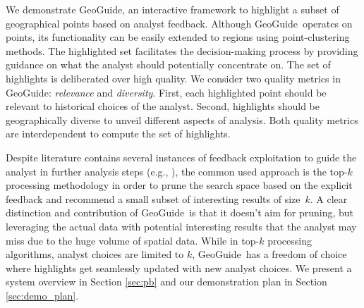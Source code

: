 \documentclass{vldb}
\newtheorem{example}{Example}
\newcommand{\framework}{{\sc GeoGuide}}
\begin{document}
\vspace{5pt}
 We demonstrate \framework, an interactive framework to highlight a subset of geographical points based on analyst feedback. Although \framework\ operates on points, its functionality can be easily extended to regions using point-clustering methods. The highlighted set facilitates the decision-making process by providing guidance on what the analyst should potentially concentrate on. The set of highlights is deliberated over high quality. We consider two quality metrics in \framework: {\em relevance} and {\em diversity}. First, each highlighted point should be relevant to historical choices of the analyst. Second, highlights should be geographically diverse to unveil different aspects of analysis. Both quality metrics are interdependent to compute the set of highlights.

Despite literature contains several instances of feedback exploitation to guide the analyst in further analysis steps (e.g., \cite{boley2013one}), the common used approach is the top-$k$ processing methodology in order to prune the search space based on the explicit feedback and recommend a small subset of interesting results of size~$k$. A clear distinction and contribution of \framework\ is that it doesn't aim for pruning, but leveraging the actual data with potential interesting results that the analyst may miss due to the huge volume of spatial data. While in top-$k$ processing algorithms, analyst choices are limited to $k$, \framework\ has a freedom of choice where highlights get seamlessly updated with new analyst choices. We present a system overview in
Section \ref{sec:pb} and our demonstration plan in Section \ref{sec:demo_plan}. 




\end{document}
